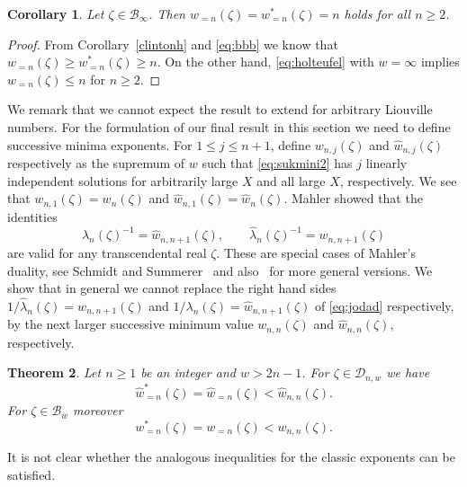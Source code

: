 \documentclass[12pt]{amsart}
\newtheorem{theorem}{Theorem}[section]
\newtheorem{corollary}[theorem]{Corollary}
\theoremstyle{definition}
\begin{document}
\begin{corollary}  \label{referenzk}
Let $\zeta\in\mathscr{B}_{\infty}$. 
Then $w_{=n}(\zeta)=w_{=n}^{\ast}(\zeta)=n$ holds for all $n\geq 2$.
\end{corollary}

\begin{proof}
From Corollary~\ref{clintonh} and \eqref{eq:bbb} we know that $w_{=n}(\zeta)\geq w_{=n}^{\ast}(\zeta)\geq n$.
On the other hand, \eqref{eq:holteufel} with $w=\infty$ implies $w_{=n}(\zeta)\leq n$ for $n\geq 2$.
\end{proof}

We remark that we cannot expect the result 
to extend for arbitrary Liouville numbers.
For the formulation of our final result in this section
we need to define successive minima exponents.
For $1\leq j\leq n+1$, define $w_{n,j}(\zeta)$ and $\widehat{w}_{n,j}(\zeta)$ respectively 
as the supremum of $w$ such that \eqref{eq:sukmini2}
has $j$ linearly independent solutions for arbitrarily large $X$ and all large $X$, respectively.
We see that $w_{n,1}(\zeta)=w_{n}(\zeta)$ and $\widehat{w}_{n,1}(\zeta)=\widehat{w}_{n}(\zeta)$.
Mahler showed that the identities
%
\begin{equation} \label{eq:mahler}
\lambda_{n}(\zeta)^{-1}=\widehat{w}_{n,n+1}(\zeta), \qquad
\widehat{\lambda}_{n}(\zeta)^{-1}=w_{n,n+1}(\zeta)
\end{equation}
%
are valid for any transcendental real $\zeta$. 
These are special cases of Mahler's duality, see 
Schmidt and Summerer~\cite{ss} 
and also~\cite[(1.24)]{j2} for more general versions. 
We show that in general we cannot replace the right hand sides 
$1/\widehat{\lambda}_{n}(\zeta)=w_{n,n+1}(\zeta)$ and 
$1/\lambda_{n}(\zeta)=\widehat{w}_{n,n+1}(\zeta)$ 
of \eqref{eq:jodad} respectively, by the next 
larger successive minimum
value $w_{n,n}(\zeta)$ and $\widehat{w}_{n,n}(\zeta)$, respectively. 

\begin{theorem} \label{prof}
Let $n\geq 1$ be an integer and $w>2n-1$. 
For $\zeta\in\mathscr{D}_{n,w}$ we have
%
\[
\widehat{w}_{=n}^{\ast}(\zeta)=\widehat{w}_{=n}(\zeta) < \widehat{w}_{n,n}(\zeta).
\]
%
For $\zeta\in\mathscr{B}_{w}$ moreover
%
\[
w_{=n}^{\ast}(\zeta)=w_{=n}(\zeta)<w_{n,n}(\zeta).
\]
%
\end{theorem}

It is not clear whether the analogous inequalities for the 
classic exponents can be satisfied.
\end{document}
